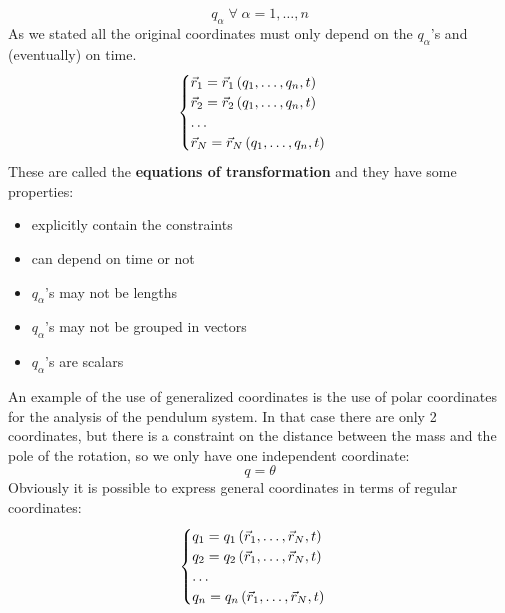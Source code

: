 \begin{equation}
    q_{\alpha}\;\forall\;\alpha = 1,\dots,n
\end{equation}
As we stated all the original coordinates must only depend on the $q_{\alpha}$'s and (eventually) on time.
\begin{equation} \label{equations_of_transformation}
    \begin{cases}
        \vec{r}_1 = \vec{r}_1\left(q_1,\dots,q_n,t\right)\\
        \vec{r}_2 = \vec{r}_2\left(q_1,\dots,q_n,t\right)\\
        \dots \\
        \vec{r}_N = \vec{r}_N\left(q_1,\dots,q_n,t\right)
    \end{cases}
\end{equation}
These are called the \textbf{equations of transformation} and they have some properties:
\begin{itemize}
    \item explicitly contain the constraints
    \item can depend on time or not
    \item $q_{\alpha}$'s may not be lengths
    \item $q_{\alpha}$'s may not be grouped in vectors
    \item $q_{\alpha}$'s are scalars
\end{itemize}
An example of the use of generalized coordinates is the use of polar coordinates for the analysis of the pendulum system. In that case there are only 2 coordinates, but there is a constraint on the distance between the mass and the pole of the rotation, so we only have one independent coordinate:
\[q=\theta\]
Obviously it is possible to express general coordinates in terms of regular coordinates:
\begin{equation} \label{inverse_equations_of_transformation}
    \begin{cases}
        q_1 = q_1\left(\vec{r}_1,\dots,\vec{r}_N,t\right)\\
        q_2 = q_2\left(\vec{r}_1,\dots,\vec{r}_N,t\right)\\
        \dots \\
        q_n = q_n\left(\vec{r}_1,\dots,\vec{r}_N,t\right)
    \end{cases}
\end{equation}
